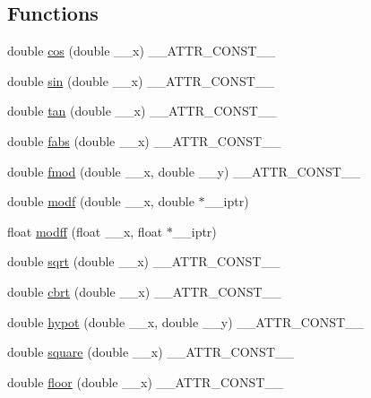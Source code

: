 \subsection*{Functions}
\begin{DoxyCompactItemize}
\item 
double \hyperlink{group__avr__math_gaab93da039c516fcee9be6efb7d4cdfb3}{cos} (double \+\_\+\+\_\+x) \+\_\+\+\_\+\+A\+T\+T\+R\+\_\+\+C\+O\+N\+S\+T\+\_\+\+\_\+
\item 
double \hyperlink{group__avr__math_gaaf9cbe0a58b6fd6758e2d977aba46eb5}{sin} (double \+\_\+\+\_\+x) \+\_\+\+\_\+\+A\+T\+T\+R\+\_\+\+C\+O\+N\+S\+T\+\_\+\+\_\+
\item 
double \hyperlink{group__avr__math_ga3aa121cf8eee9dc1647c0b83ebbd72e9}{tan} (double \+\_\+\+\_\+x) \+\_\+\+\_\+\+A\+T\+T\+R\+\_\+\+C\+O\+N\+S\+T\+\_\+\+\_\+
\item 
double \hyperlink{group__avr__math_ga8045a0b219052cc0e90e74d07925f2b0}{fabs} (double \+\_\+\+\_\+x) \+\_\+\+\_\+\+A\+T\+T\+R\+\_\+\+C\+O\+N\+S\+T\+\_\+\+\_\+
\item 
double \hyperlink{group__avr__math_gae20369249862b10d741eba7754bf733a}{fmod} (double \+\_\+\+\_\+x, double \+\_\+\+\_\+y) \+\_\+\+\_\+\+A\+T\+T\+R\+\_\+\+C\+O\+N\+S\+T\+\_\+\+\_\+
\item 
double \hyperlink{group__avr__math_ga85861fee92c0904e9bb7a9875ee77579}{modf} (double \+\_\+\+\_\+x, double $\ast$\+\_\+\+\_\+iptr)
\item 
float \hyperlink{group__avr__math_gad180f98cb1dac86425c2f4df7faf2a15}{modff} (float \+\_\+\+\_\+x, float $\ast$\+\_\+\+\_\+iptr)
\item 
double \hyperlink{group__avr__math_gaac21324d984f0af0fb87a613efb69d77}{sqrt} (double \+\_\+\+\_\+x) \+\_\+\+\_\+\+A\+T\+T\+R\+\_\+\+C\+O\+N\+S\+T\+\_\+\+\_\+
\item 
double \hyperlink{group__avr__math_ga10e79401a84266cc52fed672a8bb4a41}{cbrt} (double \+\_\+\+\_\+x) \+\_\+\+\_\+\+A\+T\+T\+R\+\_\+\+C\+O\+N\+S\+T\+\_\+\+\_\+
\item 
double \hyperlink{group__avr__math_gacb9c5b29c1ee2aed4d0f2d412a12f777}{hypot} (double \+\_\+\+\_\+x, double \+\_\+\+\_\+y) \+\_\+\+\_\+\+A\+T\+T\+R\+\_\+\+C\+O\+N\+S\+T\+\_\+\+\_\+
\item 
double \hyperlink{group__avr__math_gabb95d8256ff81d58f092c065ea204293}{square} (double \+\_\+\+\_\+x) \+\_\+\+\_\+\+A\+T\+T\+R\+\_\+\+C\+O\+N\+S\+T\+\_\+\+\_\+
\item 
double \hyperlink{group__avr__math_ga4fdf30fdaae0cbccc44343184457464d}{floor} (double \+\_\+\+\_\+x) \+\_\+\+\_\+\+A\+T\+T\+R\+\_\+\+C\+O\+N\+S\+T\+\_\+\+\_\+

\end{DoxyCompactItemize}

